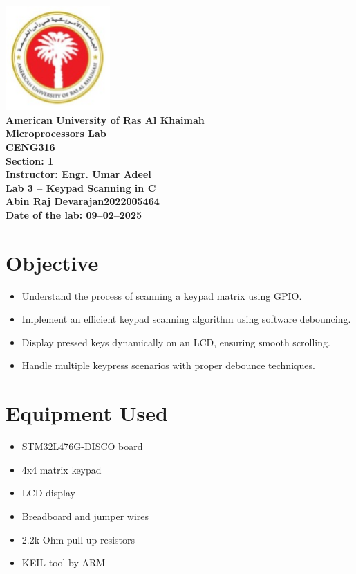 \documentclass[12pt]{article}
\begin{document}
\begin{titlepage}
    \begin{center}
        \includegraphics[width=0.3\textwidth]{AURAK Logo.jpg}\\[1cm]
        \textbf{\LARGE American University of Ras Al Khaimah}\\[2cm]
        \textbf{\Huge Microprocessors Lab}\\[0.5cm]
        \textbf{\Large CENG316}\\[1.5cm]
        \textbf{\large Section: 1}\\[0.2cm]
        \textbf{\large Instructor: Engr. Umar Adeel}\\[2cm]
        \textbf{\Large Lab 3 -- Keypad Scanning in C}\\[2cm]
        \textbf{\large Abin Raj Devarajan\hspace{1cm}2022005464}\\[2cm]
        \textbf{\large Date of the lab: 09--02--2025}
    \end{center}
\end{titlepage}

\newpage
\tableofcontents
\newpage

\section{Objective}
\begin{itemize}
    \item Understand the process of scanning a keypad matrix using GPIO.
    \item Implement an efficient keypad scanning algorithm using software debouncing.
    \item Display pressed keys dynamically on an LCD, ensuring smooth scrolling.
    \item Handle multiple keypress scenarios with proper debounce techniques.
\end{itemize}

\section{Equipment Used}
\begin{itemize}
    \item STM32L476G-DISCO board
    \item 4x4 matrix keypad
    \item LCD display
    \item Breadboard and jumper wires
    \item 2.2k Ohm pull-up resistors
    \item KEIL tool by ARM
\end{itemize}
\end{document}
